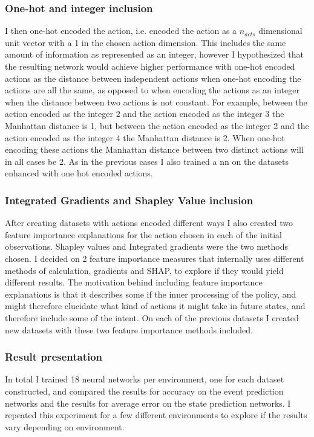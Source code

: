 \documentclass[UKenglish]{uiomasterthesis}
\begin{document}
\subsubsection{One-hot and integer inclusion}
I then one-hot encoded the action, i.e. encoded the action as a $n_{acts}$ dimensional unit vector with a 1 in the chosen action dimension. This includes the same amount of information as represented as an integer, however I hypothesized that the resulting network would achieve higher performance with one-hot encoded actions as the distance between independent actions when one-hot encoding the actions are all the same, as opposed to when encoding the actions as an integer when the distance between two actions is not constant. For example, between the action encoded as the integer 2 and the action encoded as the integer 3 the Manhattan distance is 1, but between the action encoded as the integer 2 and the action encoded as the integer 4 the Manhattan distance is 2. When one-hot encoding these actions the Manhattan distance between two distinct actions will in all cases be 2. As in the previous cases I also trained a \ac{nn} on the datasets enhanced with one hot encoded actions.

\subsubsection{Integrated Gradients and Shapley Value inclusion}
After creating datasets with actions encoded different ways I also created two feature importance explanations for the action chosen in each of the initial observations. Shapley values and Integrated gradients were the two methods chosen. I decided on 2 feature importance measures that internally uses different methods of calculation, gradients and SHAP, to explore if they would yield different results. The motivation behind including feature importance explanations is that it describes some if the inner processing of the policy, and might therefore elucidate what kind of actions it might take in future states, and therefore include some of the intent. On each of the previous datasets I created new datasets with these two feature importance methods included.\\

\subsubsection{Result presentation}
In total I trained 18 neural networks per environment, one for each dataset constructed, and compared the results for accuracy on the event prediction networks and the results for average error on the state prediction networks. I repeated this experiment for a few different environments to explore if the results vary depending on environment.
\end{document}
